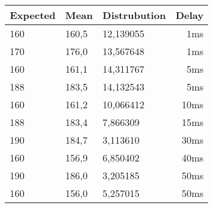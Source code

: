 \begin{center}
    \begin{tabular}{ l | l | l | r| }
        Expected&Mean&Distrubution&Delay\\
        \hline
        160&  160,5& 12,139055 & 1ms\\
        170&  176,0& 13,567648 & 1ms\\
        160&  161,1& 14,311767 & 5ms\\
        188&  183,5& 14,132543 & 5ms\\
        160&  161,2& 10,066412 & 10ms\\
        188&  183,4& 7,866309  & 15ms\\
        190&  184,7& 3,113610  & 30ms\\
        160&  156,9& 6,850402  & 40ms\\
        190&  186,0& 3,205185  & 50ms\\
        160&  156,0& 5,257015  & 50ms
    \end{tabular}
\end{center}
